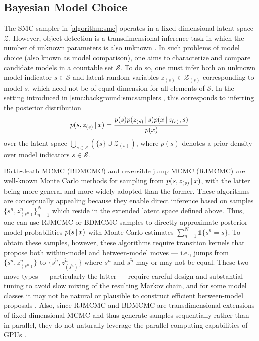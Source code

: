 \documentclass[
  12pt]{article}
\newcommand{\mathds}[1]{\mathbb{#1}}
\newcommand{\padvert}{\thinspace \vert \thinspace}
\begin{document}
\subsection{Bayesian Model Choice} \label{smc:bayesianmodelchoice}

The SMC sampler in \autoref{algorithm:smc} operates in a fixed-dimensional latent space $\mathcal{Z}$. However, object detection is a transdimensional inference task in which the number of unknown parameters is also unknown \citep{gelfand1994bayesian, hastie2012model}. In such problems of model choice (also known as model comparison), one aims to characterize and compare candidate models in a countable set $\mathcal{S}$. To do so, one must infer both an unknown model indicator $s \in \mathcal{S}$ and latent random variables $z_{(s)} \in \mathcal{Z}_{(s)}$ corresponding to model $s$, which need not be of equal dimension for all elements of $\mathcal{S}$. In the setting introduced in \autoref{smc:background:smcsamplers}, this corresponds to inferring the posterior distribution
\begin{equation*}
    p(s, z_{(s)} \padvert x) = \frac{p(s) p(z_{(s)} \padvert s) p(x \padvert z_{(s)}, s)}{p(x)}
\end{equation*}
over the latent space $\bigcup_{s \in \mathcal{S}} (\{s\} \cup \mathcal{Z}_{(s)})$, where $p(s)$ denotes a prior density over model indicators $s \in \mathcal{S}$.

Birth-death MCMC (BDMCMC) \citep{stephens2000bayesian, shi2002birth} and reversible jump MCMC (RJMCMC) \citep{green1995reversible} are well-known Monte Carlo methods for sampling from $p(s, z_{(s)} \padvert x)$, with the latter being more general and more widely adopted than the former. These algorithms are conceptually appealing because they enable direct inference based on samples $\{s^n, z^n_{(s^n)}\}_{n=1}^N$ which reside in the extended latent space defined above. Thus, one can use RJMCMC or BDMCMC samples to directly approximate posterior model probabilities $p(s \padvert x)$ with Monte Carlo estimates $\sum_{n=1}^N \mathds{1}\{s^n = s\}$. To obtain these samples, however, these algorithms require transition kernels that propose both within-model and between-model moves — i.e., jumps from $\{s^n, z_{(s^n)}^n\}$ to $\{s^{\tilde{n}}, z_{(s^{\tilde{n}})}^{\tilde{n}}\}$ where $s^n$ and $s^{\tilde{n}}$ may or may not be equal. These two move types — particularly the latter — require careful design and substantial tuning to avoid slow mixing of the resulting Markov chain, and for some model classes it may not be natural or plausible to construct efficient between-model proposals \citep{jasra2007population}. Also, since RJMCMC and BDMCMC are transdimensional extensions of fixed-dimensional MCMC and thus generate samples sequentially rather than in parallel, they do not naturally leverage the parallel computing capabilities of GPUs \citep{anderson2013massively}.
\end{document}
